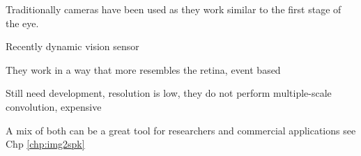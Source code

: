 Traditionally cameras have been used as they work similar to the first stage of the eye.

Recently dynamic vision sensor

They work in a way that more resembles the retina, event based

Still need development, resolution is low, they do not perform multiple-scale
convolution, expensive

A mix of both can be a great tool for researchers and commercial applications see Chp \ref{chp:img2spk}